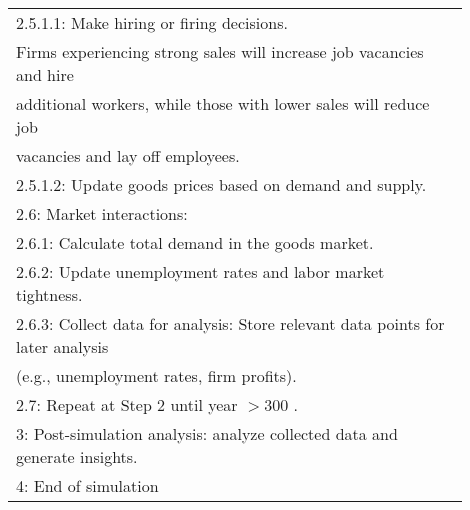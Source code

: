 \documentclass[ %
    final,
    scrbook,
    listoffigures,
    listoftables, 
    glossary]{cu-thesis}
\begin{document}
\begin{flushleft}
\begin{longtable}{p{0.9\linewidth}}
\hspace{13mm}2.5.1.1: Make hiring or firing decisions. \\
\hspace{17mm}Firms experiencing strong sales will increase job vacancies and hire\\
\hspace{17mm}additional workers, while those with lower sales will reduce job\\
\hspace{17mm}vacancies and lay off employees.\\
\hspace{13mm}2.5.1.2: Update goods prices based on demand and supply. \\
\hspace{5mm}2.6: Market interactions: \\
\hspace{10mm}2.6.1: Calculate total demand in the goods market. \\
\hspace{10mm}2.6.2: Update unemployment rates and labor market tightness. \\
\hspace{10mm}2.6.3: Collect data for analysis: Store relevant data points for later analysis\\
\hspace{13mm}(e.g., unemployment rates, firm profits). \\
\hspace{5mm}2.7: Repeat at Step 2 until year $>300$ .\\
3: Post-simulation analysis: analyze collected data and generate insights. \\
4: End of simulation \\
		\bottomrule
\end{longtable}
\end{flushleft}
\end{document}
